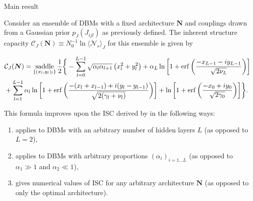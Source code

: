 \documentclass[8pt]{beamer}
\begin{document}
\begin{frame}[label={sec:org3af19bb}]{Main result}
\begin{theorem}
Consider an ensemble of DBMs with a fixed architecture \(\boldsymbol{N}\) and couplings drawn from a Gaussian prior \(p_{J}(J_{ijl})\) as previously defined. The inherent structure capacity \(\mathcal{C}_{J} (\boldsymbol{N}) \equiv N_{0}^{-1} \ln \langle \mathcal{N}_{s} \rangle_{J}\) for this ensemble is given by

\begin{align*}
&\mathcal{C}_{J} (\boldsymbol{N}) = \underset{\{(x_{l}, y_{l})_{l}\}}{\operatorname{saddle}} \thinspace \frac{1}{2} \bigg \{- \sum_{l=0}^{L-1} \sqrt{\alpha_{l} \alpha_{l+1}} \thinspace \big(x_{l}^{2} + y_{l}^{2} \big) + \alpha_{L} \ln \bigg [1 + \operatorname{erf} \bigg(\frac{- x_{L-1} - i y_{L-1}}{\sqrt{2 \nu_{L}}} \bigg) \bigg ] \\
&+ \sum_{l=1}^{L-1} \alpha_{l} \ln \bigg [1 + \operatorname{erf} \bigg(\frac{- (x_{l} + x_{l-1}) + i (y_{l} - y_{l-1})}{\sqrt{2 (\gamma_{l} + \nu_{l})}} \bigg) \bigg] + \ln \bigg [1 + \operatorname{erf} \bigg(\frac{- x_{0} + i y_{0}}{\sqrt{2 \gamma_{0}}} \bigg) \bigg] \bigg \}.
\end{align*}
\hfill \blacksquare
\label{orgc8a0373}
\end{theorem}
This formula improves upon the ISC derived by \cite{bansal2018using} in the following ways:
\begin{enumerate}
\item applies to DBMs with an arbitrary number of hidden layers \(L\) (as opposed to \(L = 2\)),
\item applies to DBMs with arbitrary proportions \((\alpha_{i})_{i=1\ldots L}\) (as opposed to \(\alpha_{1} \gg 1\) and \(\alpha_{2} \ll 1\)),
\item gives numerical values of \(\mathrm{ISC}\) for any arbitrary architecture \(\boldsymbol{N}\) (as opposed to only the optimal architecture).
\end{enumerate}
\end{frame}
\end{document}
